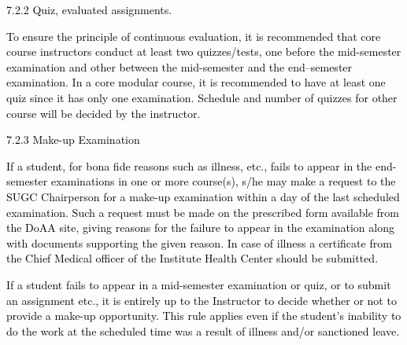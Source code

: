\documentclass[12pt]{article}
\begin{document}
\vspace{\baselineskip}

\vspace{\baselineskip}
{\fontsize{10pt}{12.0pt}\selectfont \textcolor[HTML]{00000A}{7.2.2 Quiz, evaluated assignments.}\par}\par


\vspace{\baselineskip}
\begin{justify}
{\fontsize{10pt}{12.0pt}\selectfont \textcolor[HTML]{00000A}{To ensure the principle of continuous evaluation, it is recommended that core course instructors conduct at least two quizzes/tests, one before the mid-semester examination and other between the mid-semester and the end–semester examination. In a core modular course, it is recommended to have at least one quiz since it has only one examination. Schedule and number of quizzes for other course will be decided by the instructor.}\par}
\end{justify}\par


\vspace{\baselineskip}
{\fontsize{10pt}{12.0pt}\selectfont \textcolor[HTML]{00000A}{7.2.3 Make-up Examination}\par}\par


\vspace{\baselineskip}
\begin{justify}
{\fontsize{10pt}{12.0pt}\selectfont \textcolor[HTML]{00000A}{If a student, for bona fide reasons such as illness, etc., fails to appear in the end-semester examinations in one or more course(s), s/he may make a request to the SUGC Chairperson for a make-up examination within a day of the last scheduled examination. Such a request must be made on the prescribed form available from the DoAA site, giving reasons for the failure to appear in the examination along with documents supporting the given reason. In case of illness a certificate from the Chief Medical officer of the Institute Health Center should be submitted.}\par}
\end{justify}\par


\vspace{\baselineskip}
\begin{adjustwidth}{0.0in}{0.18in}
{\fontsize{10pt}{12.0pt}\selectfont \textcolor[HTML]{00000A}{If a student fails to appear in a mid-semester examination or quiz, or to submit an assignment etc., it is entirely up to the Instructor to decide whether or not to provide a make-up opportunity. This rule applies even if the student’s inability to do the work at the scheduled time was a result of illness and/or sanctioned leave.}\par}\par

\end{adjustwidth}
\end{document}
